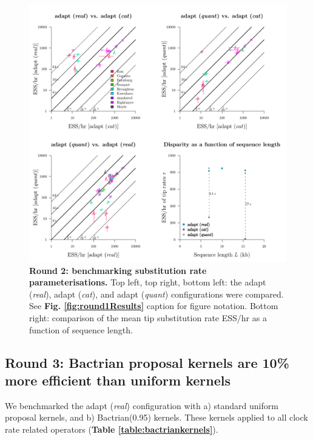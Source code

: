 \documentclass[10pt,letterpaper]{article}
\begin{document}
\begin{figure}[!h]
\includegraphics[width=\textwidth]{benchmarking/benchmarkingVM/ESS_round2.pdf}
\caption{\textbf{Round 2: benchmarking substitution rate parameterisations.} Top left, top right, bottom left: the adapt (\textit{real}), adapt (\textit{cat}), and adapt (\textit{quant}) configurations were compared. See \textbf{Fig. \ref{fig:round1Results}} caption for figure notation. Bottom right: comparison of the mean tip substitution rate ESS/hr as a function of sequence length. }
\label{fig:round2Results}
\end{figure}







\subsection*{Round 3: Bactrian proposal kernels are 10\% more efficient than uniform kernels}


We benchmarked the adapt (\textit{real}) configuration with a) standard uniform proposal kernels, and b) Bactrian(0.95) kernels.
These kernels applied to all clock rate related operators (\textbf{Table \ref{table:bactriankernels}}).
\end{document}
